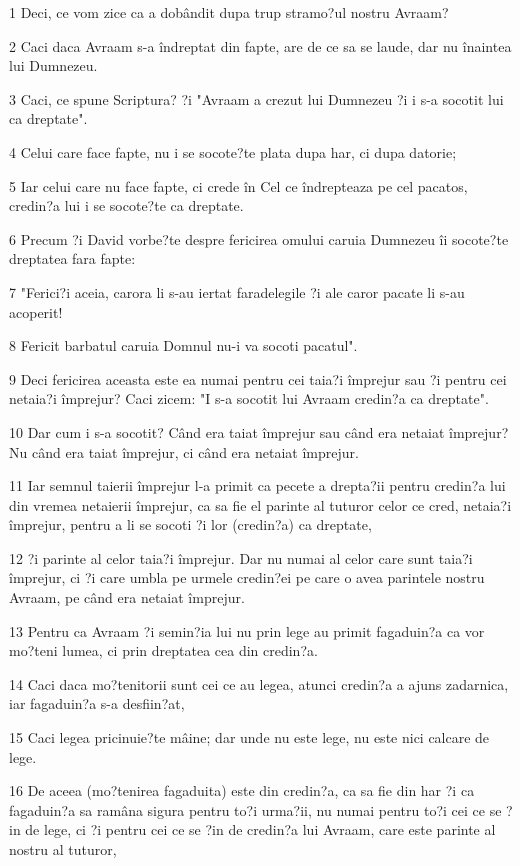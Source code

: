 \par 1 Deci, ce vom zice ca a dobândit dupa trup stramo?ul nostru Avraam?
\par 2 Caci daca Avraam s-a îndreptat din fapte, are de ce sa se laude, dar nu înaintea lui Dumnezeu.
\par 3 Caci, ce spune Scriptura? ?i "Avraam a crezut lui Dumnezeu ?i i s-a socotit lui ca dreptate".
\par 4 Celui care face fapte, nu i se socote?te plata dupa har, ci dupa datorie;
\par 5 Iar celui care nu face fapte, ci crede în Cel ce îndrepteaza pe cel pacatos, credin?a lui i se socote?te ca dreptate.
\par 6 Precum ?i David vorbe?te despre fericirea omului caruia Dumnezeu îi socote?te dreptatea fara fapte:
\par 7 "Ferici?i aceia, carora li s-au iertat faradelegile ?i ale caror pacate li s-au acoperit!
\par 8 Fericit barbatul caruia Domnul nu-i va socoti pacatul".
\par 9 Deci fericirea aceasta este ea numai pentru cei taia?i împrejur sau ?i pentru cei netaia?i împrejur? Caci zicem: "I s-a socotit lui Avraam credin?a ca dreptate".
\par 10 Dar cum i s-a socotit? Când era taiat împrejur sau când era netaiat împrejur? Nu când era taiat împrejur, ci când era netaiat împrejur.
\par 11 Iar semnul taierii împrejur l-a primit ca pecete a drepta?ii pentru credin?a lui din vremea netaierii împrejur, ca sa fie el parinte al tuturor celor ce cred, netaia?i împrejur, pentru a li se socoti ?i lor (credin?a) ca dreptate,
\par 12 ?i parinte al celor taia?i împrejur. Dar nu numai al celor care sunt taia?i împrejur, ci ?i care umbla pe urmele credin?ei pe care o avea parintele nostru Avraam, pe când era netaiat împrejur.
\par 13 Pentru ca Avraam ?i semin?ia lui nu prin lege au primit fagaduin?a ca vor mo?teni lumea, ci prin dreptatea cea din credin?a.
\par 14 Caci daca mo?tenitorii sunt cei ce au legea, atunci credin?a a ajuns zadarnica, iar fagaduin?a s-a desfiin?at,
\par 15 Caci legea pricinuie?te mâine; dar unde nu este lege, nu este nici calcare de lege.
\par 16 De aceea (mo?tenirea fagaduita) este din credin?a, ca sa fie din har ?i ca fagaduin?a sa ramâna sigura pentru to?i urma?ii, nu numai pentru to?i cei ce se ?in de lege, ci ?i pentru cei ce se ?in de credin?a lui Avraam, care este parinte al nostru al tuturor,
